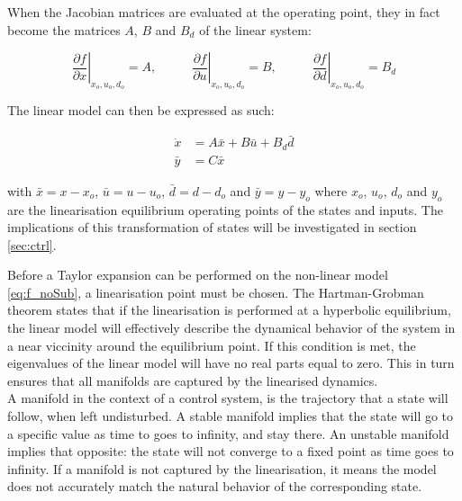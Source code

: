 When the Jacobian matrices are evaluated at the operating point, they in fact become the matrices $ A $, $ B $ and $ B_d  $ of the linear system:

\begin{equation}
	\left. \dfrac{\partial f}{\partial x} \right |_{x_o, u_o, d_o} = A, \;\;\;\;\;\;\;\;\;\;
	\left. \dfrac{\partial f}{\partial u} \right |_{x_o, u_o, d_o} = B, \;\;\;\;\;\;\;\;\;\;
	\left. \dfrac{\partial f}{\partial d} \right |_{x_o, u_o, d_o} = B_d
\end{equation}

The linear model can then be expressed as such:

\begin{equation} \label{eq:state_space_linear}
	\begin{split}
		\dot{x} & = A\bar{x} + B\bar{u} + B_d\bar{d} \\
		\bar{y} & = C\bar{x}
	\end{split}
\end{equation}

with $\bar{x} = x-x_o$, $\bar{u} = u-u_o$, $\bar{d} = d-d_o$ and $\bar{y} = y-y_o$ where $x_o$, $u_o$, $d_o$ and $y_o$ are the linearisation equilibrium operating points of the states and inputs. The implications of this transformation of states will be investigated in section \cref{sec:ctrl}.



Before a Taylor expansion can be performed on the non-linear model \cref{eq:f_noSub}, a linearisation point must be chosen. The Hartman-Grobman theorem states that if the linearisation is performed at a hyperbolic equilibrium, the linear model will effectively describe the dynamical behavior of the system in a near viccinity around the equilibrium point. If this condition is met, the eigenvalues of the linear model will have no real parts equal to zero. This in turn ensures that all manifolds are captured by the linearised dynamics. \\
A manifold in the context of a control system, is the trajectory that a state will follow, when left undisturbed. A stable manifold implies that the state will go to a specific value as time to goes to infinity, and stay there. An unstable manifold implies that opposite: the state will not converge to a fixed point as time goes to infinity. If a manifold is not captured by the linearisation, it means the model does not accurately match the natural behavior of the corresponding state.\\

